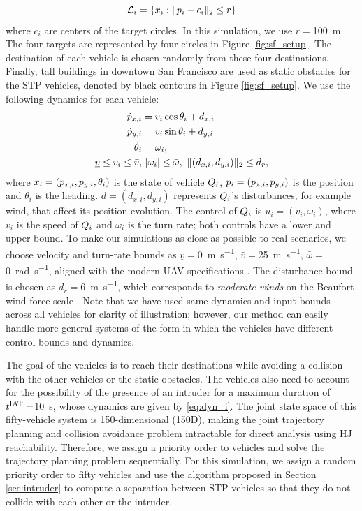 \begin{equation}
\label{eq:target_sim}
\targetset_i = \{\state_i: \|\pos_i - c_i\|_2 \le r\}
\end{equation}
\noindent where $c_i$ are centers of the target circles. In this simulation, we use $r = $\SI{100}{\m}. The four targets are represented by four circles in Figure \ref{fig:sf_setup}. The destination of each vehicle is chosen randomly from these four destinations. Finally, tall buildings in downtown San Francisco are used as static obstacles for the STP vehicles, denoted by black contours in Figure \ref{fig:sf_setup}. We use the following dynamics for each vehicle:
\begin{equation}
\label{eq:dyn_i}
\begin{aligned}
\dot{\pos}_{x,i} &= v_i \cos \theta_i + d_{x,i} \\
\dot{\pos}_{y,i} &= v_i \sin \theta_i + d_{y,i}\\
\dot{\theta}_i &= \omega_i, \\
\underline{v} \le v_i \le \bar{v}, & ~|\omega_i| \le \bar{\omega}, ~\|(d_{x,i}, d_{y,i}) \|_2 \le d_{r},
\end{aligned}
\end{equation}
\noindent where $x_i = (p_{x,i}, p_{y,i}, \theta_i)$ is the state of vehicle $Q_i$, $p_i = (p_{x,i}, p_{y,i})$ is the position and $\theta_i$ is the heading. $d = (d_{x,i}, d_{y,i})$ represents $Q_i$'s disturbances, for example wind, that affect its position evolution. The control of $Q_i$ is $u_i = (v_i, \omega_i)$, where $v_i$ is the speed of $Q_i$ and $\omega_i$ is the turn rate; both controls have a lower and upper bound. To make our simulations as close as possible to real scenarios, we choose velocity and turn-rate bounds as $\underline{v} = $\SI{0}{\m\per\s}, $\bar{v} = $\SI{25}{\m\per\s}, $\bar\omega = $\SI{0}{\radian\per\s}, aligned with the modern UAV specifications \cite{UAVspecs1, UAVspecs2}. The disturbance bound is chosen as $d_{r} = $\SI{6}{\m\per\s}, which corresponds to \textit{moderate winds} on the Beaufort wind force scale \cite{Windscale}. Note that we have used same dynamics and input bounds across all vehicles for clarity of illustration; however, our method can easily handle more general systems of the form in which the vehicles have different control bounds and dynamics.

The goal of the vehicles is to reach their destinations while avoiding a collision with the other vehicles or the static obstacles. The vehicles also need to account for the possibility of the presence of an intruder for a maximum duration of $t^\text{IAT} = $\SI{10}{\s}, whose dynamics are given by \eqref{eq:dyn_i}. The joint state space of this fifty-vehicle system is 150-dimensional (150D), making the joint trajectory planning and collision avoidance problem intractable for direct analysis using HJ reachability. Therefore, we assign a priority order to vehicles and solve the trajectory planning problem sequentially. For this simulation, we assign a random priority order to fifty vehicles and use the algorithm proposed in Section \ref{sec:intruder} to compute a separation between STP vehicles so that they do not collide with each other or the intruder. 

